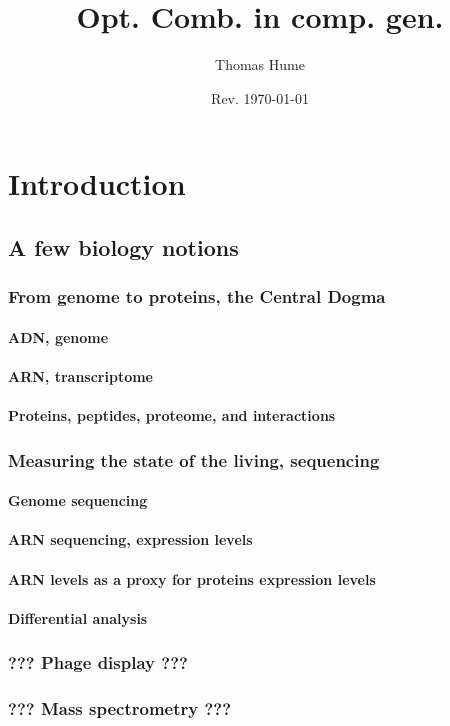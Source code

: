 \documentclass[draft]{memoir}
\title{Opt. Comb. in comp. gen.}
\author{Thomas Hume}
\date{Rev. \today}
\begin{document}
\tableofcontents

\chapter{Introduction}
 \section{A few biology notions}
  \subsection{From genome to proteins, the Central Dogma}
   \subsubsection{ADN, genome}
   \subsubsection{ARN, transcriptome}
   \subsubsection{Proteins, peptides, proteome, and interactions}
  \subsection{Measuring the state of the living, sequencing}
   \subsubsection{Genome sequencing}
   \subsubsection{ARN sequencing, expression levels}
   \subsubsection{ARN levels as a proxy for proteins expression levels}
   \subsubsection{Differential analysis}
  \subsection{??? Phage display ???}
  \subsection{??? Mass spectrometry ???}
\end{document}
